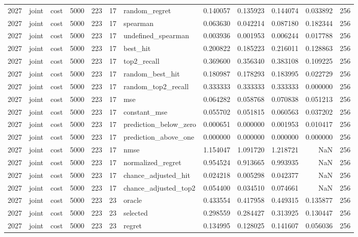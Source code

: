 \begin{tabular}{rllrrrlrrrrr}
2027 & joint & cost & 5000 & 223 & 17 & random_regret & 0.140057 & 0.135923 & 0.144074 & 0.033892 & 256 \\
2027 & joint & cost & 5000 & 223 & 17 & spearman & 0.063630 & 0.042214 & 0.087180 & 0.182344 & 256 \\
2027 & joint & cost & 5000 & 223 & 17 & undefined_spearman & 0.003936 & 0.001953 & 0.006244 & 0.017788 & 256 \\
2027 & joint & cost & 5000 & 223 & 17 & best_hit & 0.200822 & 0.185223 & 0.216011 & 0.128863 & 256 \\
2027 & joint & cost & 5000 & 223 & 17 & top2_recall & 0.369600 & 0.356340 & 0.383108 & 0.109225 & 256 \\
2027 & joint & cost & 5000 & 223 & 17 & random_best_hit & 0.180987 & 0.178293 & 0.183995 & 0.022729 & 256 \\
2027 & joint & cost & 5000 & 223 & 17 & random_top2_recall & 0.333333 & 0.333333 & 0.333333 & 0.000000 & 256 \\
2027 & joint & cost & 5000 & 223 & 17 & mse & 0.064282 & 0.058768 & 0.070838 & 0.051213 & 256 \\
2027 & joint & cost & 5000 & 223 & 17 & constant_mse & 0.055702 & 0.051815 & 0.060563 & 0.037202 & 256 \\
2027 & joint & cost & 5000 & 223 & 17 & prediction_below_zero & 0.000651 & 0.000000 & 0.001953 & 0.010417 & 256 \\
2027 & joint & cost & 5000 & 223 & 17 & prediction_above_one & 0.000000 & 0.000000 & 0.000000 & 0.000000 & 256 \\
2027 & joint & cost & 5000 & 223 & 17 & nmse & 1.154047 & 1.091720 & 1.218721 & NaN & 256 \\
2027 & joint & cost & 5000 & 223 & 17 & normalized_regret & 0.954524 & 0.913665 & 0.993935 & NaN & 256 \\
2027 & joint & cost & 5000 & 223 & 17 & chance_adjusted_hit & 0.024218 & 0.005298 & 0.042377 & NaN & 256 \\
2027 & joint & cost & 5000 & 223 & 17 & chance_adjusted_top2 & 0.054400 & 0.034510 & 0.074661 & NaN & 256 \\
2027 & joint & cost & 5000 & 223 & 23 & oracle & 0.433554 & 0.417958 & 0.449315 & 0.135877 & 256 \\
2027 & joint & cost & 5000 & 223 & 23 & selected & 0.298559 & 0.284427 & 0.313925 & 0.130447 & 256 \\
2027 & joint & cost & 5000 & 223 & 23 & regret & 0.134995 & 0.128025 & 0.141607 & 0.056036 & 256 \\

\end{tabular}

